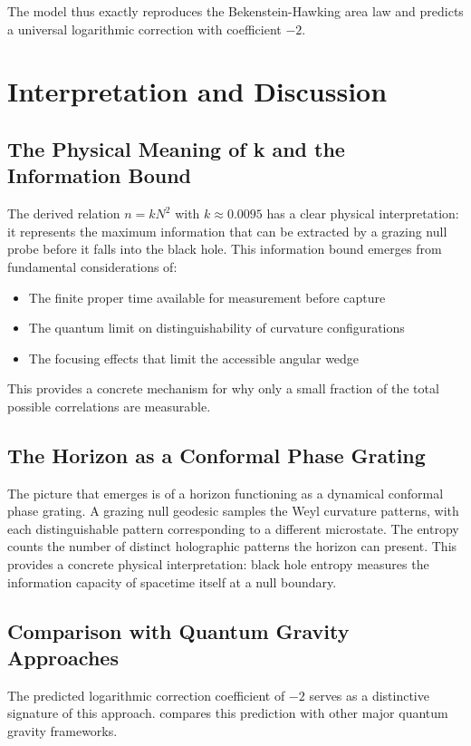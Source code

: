 \documentclass[12pt, letterpaper]{article}
\begin{document}
The model thus exactly reproduces the Bekenstein-Hawking area law and predicts a universal logarithmic correction with coefficient $-2$.

\section{Interpretation and Discussion}
\label{sec:discussion}

\subsection{The Physical Meaning of k and the Information Bound}
The derived relation $n = kN^2$ with $k \approx 0.0095$ has a clear physical interpretation: it represents the maximum information that can be extracted by a grazing null probe before it falls into the black hole. This information bound emerges from fundamental considerations of:
\begin{itemize}
\item The finite proper time available for measurement before capture
\item The quantum limit on distinguishability of curvature configurations
\item The focusing effects that limit the accessible angular wedge
\end{itemize}

This provides a concrete mechanism for why only a small fraction of the total possible correlations are measurable.

\subsection{The Horizon as a Conformal Phase Grating}
The picture that emerges is of a horizon functioning as a dynamical conformal phase grating. A grazing null geodesic samples the Weyl curvature patterns, with each distinguishable pattern corresponding to a different microstate. The entropy counts the number of distinct holographic patterns the horizon can present. This provides a concrete physical interpretation: black hole entropy measures the information capacity of spacetime itself at a null boundary.

\subsection{Comparison with Quantum Gravity Approaches}
The predicted logarithmic correction coefficient of $-2$ serves as a distinctive signature of this approach.  compares this prediction with other major quantum gravity frameworks.
\end{document}
